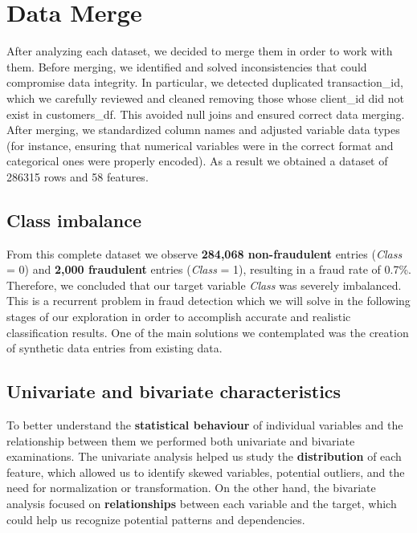 \documentclass[12pt,a4paper]{report}
\begin{document}
\section{Data Merge}
After analyzing each dataset, we decided to merge them in order to work with them. Before merging, we identified and solved inconsistencies that could compromise data integrity. In particular, we detected duplicated transaction\_id, which we carefully reviewed and cleaned removing those whose client\_id did not exist in customers\_df. This avoided null joins and ensured correct data merging. 
After merging, we standardized column names and adjusted variable data types (for instance, ensuring that numerical variables were in the correct format and categorical ones were properly encoded).
As a result we obtained a dataset of 286315 rows and 58 features.

\subsection{Class imbalance}
From this complete dataset we observe \textbf{284,068 non-fraudulent} entries (\textit{Class} = 0) and \textbf{2,000 fraudulent} entries (\textit{Class} = 1), resulting in a fraud rate of 0.7\%. Therefore, we concluded that our target variable \textit{Class} was severely imbalanced.
This is a recurrent problem in fraud detection which we will solve in the following stages of our exploration in order to accomplish accurate and realistic classification results. One of the main solutions we contemplated was the creation of synthetic data entries from existing data.

\subsection{Univariate and bivariate characteristics}
To better understand the \textbf{statistical behaviour} of individual variables and the relationship between them we performed both univariate and bivariate examinations. The univariate analysis helped us study the \textbf{distribution} of each feature, which allowed us to identify skewed variables, potential outliers, and the need for normalization or transformation. On the other hand, the bivariate analysis focused on \textbf{relationships} between each variable and the target, which could help us recognize potential patterns and dependencies.
\end{document}
